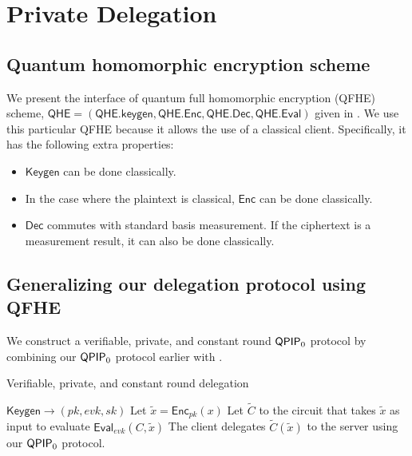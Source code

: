\section{Private Delegation}


\subsection{Quantum homomorphic encryption scheme}


We present the interface of quantum full homomorphic encryption (QFHE) scheme, $\mathsf{QHE}=(\mathsf{QHE.keygen}, \mathsf{QHE.Enc}, \mathsf{QHE.Dec}, \mathsf{QHE.Eval})$ given in \cite{mahadev_qfhe}. We use this particular QFHE because it allows the use of a classical client. Specifically, it has the following extra properties:
\begin{itemize}
	\item $\mathsf{Keygen}$ can be done classically.
	\item In the case where the plaintext is classical, $\mathsf{Enc}$ can be done classically.
	\item $\mathsf{Dec}$ commutes with standard basis measurement. If the ciphertext is a measurement result, it can also be done classically.
\end{itemize}

\subsection{Generalizing our delegation protocol using QFHE}

We construct a verifiable, private, and constant round $\operatorname{\mathsf{QPIP}}_0$ protocol by combining our $\operatorname{\mathsf{QPIP}}_0$ protocol earlier with \cite{mahadev_qfhe}.

\begin{algorithm}
	\caption{Verifiable, private, and constant round delegation}
	\label{ProtoPrivateDelegation}
	\begin{algorithmic}[1]
			\State $\mathsf{Keygen}\rightarrow(pk, evk, sk)$
			\State Let $\tilde{x}=\mathsf{Enc}_{pk}(x)$
			\State Let $\tilde{C}$ to the circuit that takes $\tilde{x}$ as input to evaluate $\mathsf{Eval}_{evk}(C, \tilde{x})$
			\State The client delegates $\tilde{C}(\tilde{x})$ to the server using our $\operatorname{\mathsf{QPIP}}_0$ protocol.
		\EndProcedure
	\end{algorithmic}
\end{algorithm}

